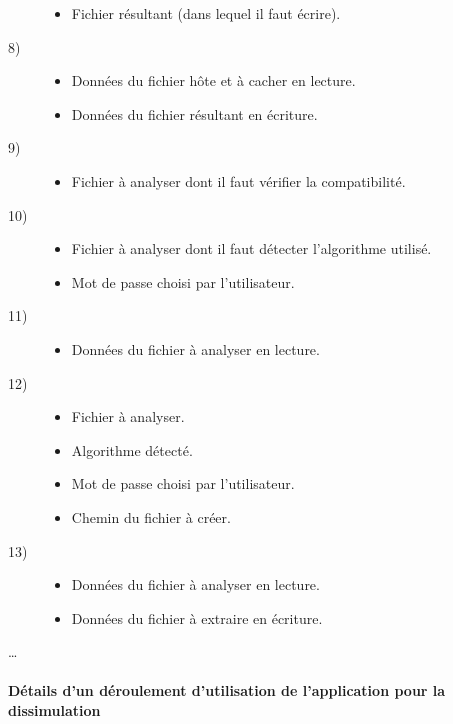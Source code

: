 \documentclass[11pt]{article}
\begin{document}
\begin{multicols}{2}
\begin{description}
\begin{itemize}
\item Fichier résultant (dans lequel il faut écrire). 
\end{itemize}
\item[8)] %
\begin{itemize}
\item Données du fichier hôte et à cacher en lecture. 
\item Données du fichier résultant en écriture. 
\end{itemize}
\item[9)] %
\begin{itemize}
\item Fichier à analyser dont il faut vérifier la compatibilité. 
\end{itemize}
\item[10)] 
\begin{itemize}
\item Fichier à analyser dont il faut détecter l'algorithme utilisé. 
\item Mot de passe choisi par l'utilisateur. 
\end{itemize}
\item[11)] 
\begin{itemize}
\item Données du fichier à analyser en lecture.
\end{itemize}
\item[12)]
\begin{itemize}
\item Fichier à analyser.
\item Algorithme détecté. 
\item Mot de passe choisi par l'utilisateur. 
\item Chemin du fichier à créer. 
\end{itemize}
\item[13)]
\begin{itemize}
\item Données du fichier à analyser en lecture.
\item Données du fichier à extraire en écriture. 
\end{itemize}
\end{description}
  \ldots
\end{multicols}

\paragraph{Détails d'un déroulement d'utilisation de l'application pour la 
dissimulation}
\end{document}
